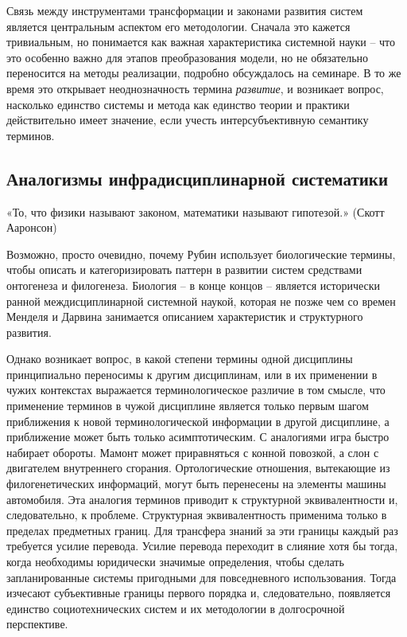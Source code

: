 \documentclass[a4paper,11pt]{article}
\begin{document}
Связь между инструментами трансформации и законами развития систем является
центральным аспектом его методологии. Сначала это кажется тривиальным, но
понимается как важная характеристика системной науки \cite{Kleemann2020} --
что это особенно важно для этапов преобразования модели, но не обязательно
переносится на методы реализации, подробно обсуждалось на семинаре. В то же
время это открывает неоднозначность термина \emph{развитие}, и возникает
вопрос, насколько единство системы и метода как единство теории и практики
действительно имеет значение, если учесть интерсубъективную семантику
терминов.

\subsection{Аналогизмы инфрадисциплинарной систематики}

«То, что физики называют законом, математики называют гипотезой.» (Скотт
Ааронсон)

Возможно, просто очевидно, почему Рубин использует биологические термины,
чтобы описать и категоризировать паттерн в развитии систем средствами
онтогенеза и филогенеза. Биология -- в конце концов --  является исторически
ранной междисциплинарной системной наукой, которая не позже чем со времен
Менделя и Дарвина занимается описанием характеристик и структурного 
развития.

Однако возникает вопрос, в какой степени термины одной дисциплины
принципиально переносимы к другим дисциплинам, или в их применении в чужих
контекстах выражается терминологическое различие в том смысле, что применение
терминов в чужой дисциплине является только первым шагом приближения к новой
терминологической информации в другой дисциплине, а приближение 
может быть только асимптотическим. С аналогиями игра быстро набирает
обороты. Мамонт может приравняться с конной повозкой, а слон с двигателем
внутреннего сгорания. Ортологические отношения, вытекающие из
филогенетических информаций, могут быть перенесены на элементы машины
автомобиля.  Эта аналогия терминов приводит к структурной
эквивалентности и, следовательно, к проблеме. Структурная
эквивалентность применима только в пределах предметных границ. Для трансфера
знаний за эти границы каждый раз требуется усилие перевода.  Усилие перевода
переходит в слияние хотя бы тогда, когда необходимы юридически значимые
определения, чтобы сделать запланированные системы пригодными для
повседневного использования. Тогда изчесают субъективные границы первого
порядка и, следовательно, появляется единство социотехнических систем и их
методологии в долгосрочной перспективе. 
\end{document}
